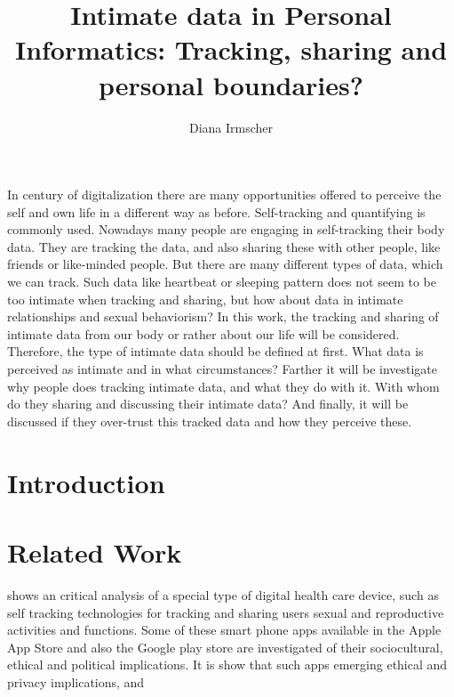 \documentclass[journal]{vgtc}                %
\title{Intimate data in Personal Informatics: Tracking, sharing and personal boundaries?}
\author{Diana Irmscher}
\begin{document}

\maketitle

%
%
In century of digitalization there are many opportunities offered to perceive the self and own life in a different way as before. Self-tracking and quantifying is commonly used. Nowadays many people are engaging in self-tracking their body data. They are tracking the data, and also sharing these with other people, like friends or like-minded people. But there are many different types of data, which we can track. Such data like heartbeat or sleeping pattern does not seem to be too intimate when tracking and sharing, but how about data in intimate relationships and sexual behaviorism? In this work, the tracking and sharing of intimate data from our body or rather about our life will be considered. Therefore, the type of intimate data should be defined at first. What data is perceived as intimate and in what circumstances? Farther it will be investigate why people does tracking intimate data, and what they do with it. With whom do they sharing and discussing their intimate data? And finally, it will  be discussed if they over-trust this tracked data and how they perceive these.


\section{Introduction}


\section{Related Work}
\cite{doi:10.1080/13691058.2014.920528} shows an critical analysis of a special type of digital health care device, such as self tracking technologies for tracking and sharing users sexual and reproductive activities and functions. Some of these smart phone apps available in the Apple App Store and also the Google play store are investigated of their sociocultural, ethical and political implications. It is show that such apps emerging ethical and privacy implications, and 
\end{document}
